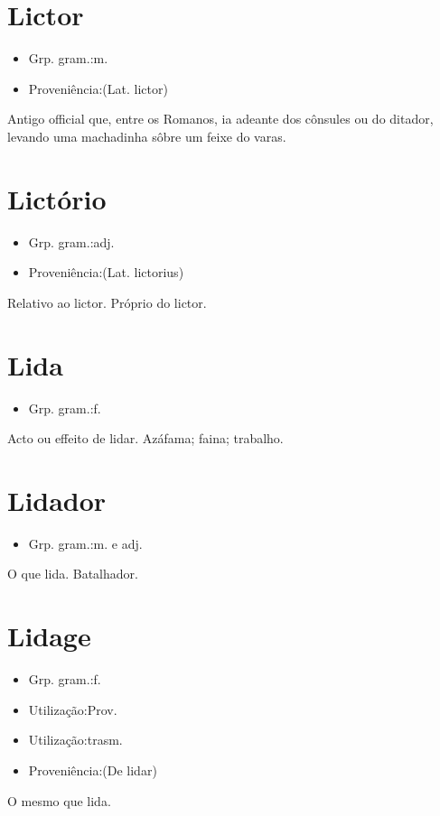 \section{Lictor}
\begin{itemize}
\item {Grp. gram.:m.}
\end{itemize}
\begin{itemize}
\item {Proveniência:(Lat. \textunderscore lictor\textunderscore )}
\end{itemize}
Antigo official que, entre os Romanos, ia adeante dos cônsules ou do ditador, levando uma machadinha sôbre um feixe do varas.
\section{Lictório}
\begin{itemize}
\item {Grp. gram.:adj.}
\end{itemize}
\begin{itemize}
\item {Proveniência:(Lat. \textunderscore lictorius\textunderscore )}
\end{itemize}
Relativo ao lictor.
Próprio do lictor.
\section{Lida}
\begin{itemize}
\item {Grp. gram.:f.}
\end{itemize}
Acto ou effeito de lidar.
Azáfama; faina; trabalho.
\section{Lidador}
\begin{itemize}
\item {Grp. gram.:m.  e  adj.}
\end{itemize}
O que lida.
Batalhador.
\section{Lidage}
\begin{itemize}
\item {Grp. gram.:f.}
\end{itemize}
\begin{itemize}
\item {Utilização:Prov.}
\end{itemize}
\begin{itemize}
\item {Utilização:trasm.}
\end{itemize}
\begin{itemize}
\item {Proveniência:(De \textunderscore lidar\textunderscore )}
\end{itemize}
O mesmo que \textunderscore lida\textunderscore .
